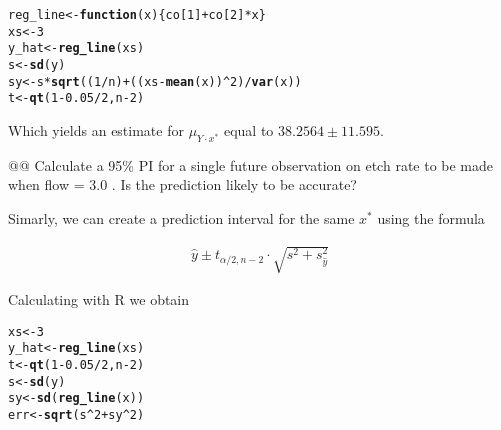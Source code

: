 \documentclass[10pt]{article}\usepackage[]{graphicx}\usepackage[]{xcolor}
\makeatletter
\newcommand{\hlnum}[1]{\textcolor[rgb]{0.686,0.059,0.569}{#1} }%
\newcommand{\hlopt}[1]{\textcolor[rgb]{0,0,0}{#1} }%
\newcommand{\hlstd}[1]{\textcolor[rgb]{0.345,0.345,0.345}{#1} }%
\newcommand{\hlkwa}[1]{\textcolor[rgb]{0.161,0.373,0.58}{\textbf{#1} } }%
\newcommand{\hlkwb}[1]{\textcolor[rgb]{0.69,0.353,0.396}{#1} }%
\newcommand{\hlkwc}[1]{\textcolor[rgb]{0.333,0.667,0.333}{#1} }%
\newcommand{\hlkwd}[1]{\textcolor[rgb]{0.737,0.353,0.396}{\textbf{#1} } }%
\newenvironment{kframe}{%
 \def\at@end@of@kframe{}%
 \ifinner\ifhmode%
  \def\at@end@of@kframe{\end{minipage} }%
  \begin{minipage}{\columnwidth}%
 \fi\fi%
 \def\FrameCommand##1{\hskip\@totalleftmargin \hskip-\fboxsep
 \colorbox{shadecolor}{##1}\hskip-\fboxsep
     \hskip-\linewidth \hskip-\@totalleftmargin \hskip\columnwidth}%
 \MakeFramed {\advance\hsize-\width
   \@totalleftmargin\z@ \linewidth\hsize
   \@setminipage} }%
 {\par\unskip\endMakeFramed%
 \at@end@of@kframe}
\newenvironment{knitrout}{}{} %
\makeatother
\begin{document}
\begin{easylist}[enumerate]
\begin{knitrout}
\color{fgcolor}\begin{kframe}
\begin{alltt}
         \hlstd{reg_line} \hlkwb{<-} \hlkwa{function}\hlstd{(}\hlkwc{x}\hlstd{) \{ co[}\hlnum{1}\hlstd{]} \hlopt{+} \hlstd{co[}\hlnum{2}\hlstd{]} \hlopt{*} \hlstd{x \} }
         \hlstd{xs} \hlkwb{<-} \hlnum{3}
         \hlstd{y_hat} \hlkwb{<-} \hlkwd{reg_line}\hlstd{(xs)}
         \hlstd{s} \hlkwb{<-} \hlkwd{sd}\hlstd{(y)}
         \hlstd{sy} \hlkwb{<-} \hlstd{s} \hlopt{*} \hlkwd{sqrt}\hlstd{((}\hlnum{1}\hlopt{/}\hlstd{n)} \hlopt{+} \hlstd{((xs} \hlopt{-} \hlkwd{mean}\hlstd{(x))}\hlopt{^}\hlnum{2}\hlstd{)}\hlopt{/}\hlkwd{var}\hlstd{(x))}
         \hlstd{t} \hlkwb{<-} \hlkwd{qt}\hlstd{(}\hlnum{1} \hlopt{-} \hlnum{0.05} \hlopt{/} \hlnum{2}\hlstd{, n} \hlopt{-} \hlnum{2}\hlstd{)}
\end{alltt}
\end{kframe}
\end{knitrout}


    Which yields an estimate for $\mu_{Y\cdot x^*}$ equal to $38.2564 \pm 11.595$.

    @@ Calculate a 95\% PI for a single future observation on etch rate to be made when flow = 3.0 . Is the prediction
    likely to be accurate?\newline

    Simarly, we can create a prediction interval for the same $x^*$ using the formula

    \begin{equation}
        \begin{aligned}
            \hat{y} \pm t_{\alpha / 2, n - 2} \cdot \sqrt{s^2 + s^2_{\hat{y} } }
        \end{aligned}
    \end{equation}

    Calculating with R we obtain

\begin{knitrout}
\color{fgcolor}\begin{kframe}
\begin{alltt}
         \hlstd{xs} \hlkwb{<-} \hlnum{3}
         \hlstd{y_hat} \hlkwb{<-} \hlkwd{reg_line}\hlstd{(xs)}
         \hlstd{t} \hlkwb{<-} \hlkwd{qt}\hlstd{(}\hlnum{1} \hlopt{-} \hlnum{0.05} \hlopt{/} \hlnum{2}\hlstd{, n} \hlopt{-} \hlnum{2}\hlstd{)}
         \hlstd{s} \hlkwb{<-} \hlkwd{sd}\hlstd{(y)}
         \hlstd{sy} \hlkwb{<-} \hlkwd{sd}\hlstd{(}\hlkwd{reg_line}\hlstd{(x))}
         \hlstd{err} \hlkwb{<-} \hlkwd{sqrt}\hlstd{(s}\hlopt{^}\hlnum{2} \hlopt{+} \hlstd{sy}\hlopt{^}\hlnum{2}\hlstd{)}
\end{alltt}
\end{kframe}
\end{knitrout}



\end{easylist}
\end{document}
